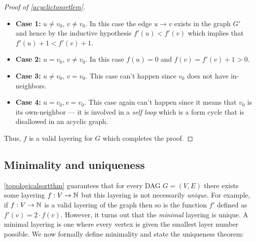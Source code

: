\begin{proof}[Proof of \cref{acyclictosortlem}]
\begin{itemize}
\item
  \textbf{Case 1:} \(u \neq v_0\), \(v \neq v_0\). In this case the edge
  \(u \rightarrow v\) exists in the graph \(G'\) and hence by the
  inductive hypothesis \(f'(u) < f'(v)\) which implies that
  \(f'(u)+1 < f'(v)+1\).
\item
  \textbf{Case 2:} \(u=v_0\), \(v \neq v_0\). In this case \(f(u)=0\)
  and \(f(v) = f'(v)+1>0\).
\item
  \textbf{Case 3:} \(u \neq v_0\), \(v=v_0\). This case can't happen
  since \(v_0\) does not have in-neighbors.
\item
  \textbf{Case 4:} \(u=v_0, v=v_0\). This case again can't happen since
  it means that \(v_0\) is its own-neighbor --- it is involved in a
  \emph{self loop} which is a form cycle that is disallowed in an
  acyclic graph.
\end{itemize}

Thus, \(f\) is a valid layering for \(G\) which completes the proof.

\end{proof}


\subsection{Minimality and uniqueness}\label{Minimality-and-uniqueness}

\cref{topologicalsortthm} guarantees that for every DAG \(G=(V,E)\)
there exists some layering \(f:V \rightarrow {\mathbb{N}}\) but this layering is
not necessarily \emph{unique}. For example, if \(f:V \rightarrow {\mathbb{N}}\) is
a valid layering of the graph then so is the function \(f'\) defined as
\(f'(v) = 2\cdot f(v)\). However, it turns out that the \emph{minimal}
layering is unique. A minimal layering is one where every vertex is
given the smallest layer number possible. We now formally define
minimality and state the uniqueness theorem:

